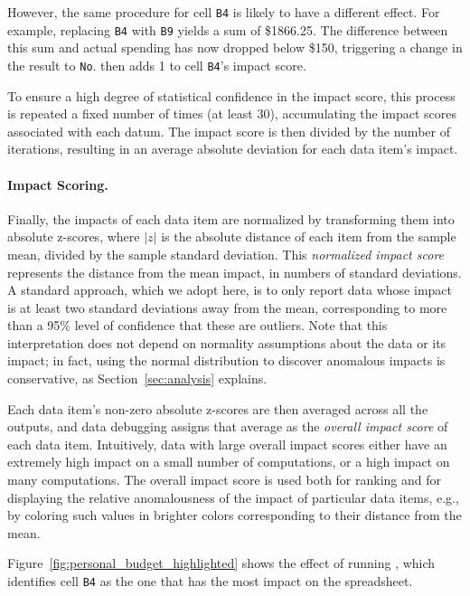 However, the same procedure for cell \texttt{B4} is likely to have a
different effect.  For example, replacing \texttt{B4}
with \texttt{B9} yields a sum of \$1866.25. The difference
between this sum and actual spending has now dropped below \$150,
triggering a change in the result to \texttt{No}. \checkcell{} then
adds 1 to cell \texttt{B4}'s impact score.


To ensure a high degree of statistical confidence in the impact score,
this process is repeated a fixed number of times (at least 30),
accumulating the impact scores associated with each datum. The impact
score is then divided by the number of iterations, resulting in an
average absolute deviation for each data item's impact.

\paragraph{Impact Scoring.}
Finally, the impacts of each data item are normalized by transforming
them into absolute z-scores, where $|z|$ is the absolute distance of
each item from the sample mean, divided by the sample standard
deviation. This \emph{normalized impact score} represents the distance
from the mean impact, in numbers of standard deviations. A standard
approach, which we adopt here, is to only report data whose impact is
at least two standard deviations away from the mean, corresponding to
more than a 95\% level of confidence that these are outliers.  Note
that this interpretation does not depend on normality assumptions
about the data or its impact; in fact, using the normal distribution
to discover anomalous impacts is conservative, as
Section~\ref{sec:analysis} explains.

Each data item's non-zero absolute z-scores are then averaged across
all the outputs, and data debugging assigns that average as the
\emph{overall impact score} of each data item. Intuitively, data with
large overall impact scores either have an extremely high impact on a
small number of computations, or a high impact on many
computations. The overall impact score is used both for ranking and
for displaying the relative anomalousness of the impact of particular
data items, e.g., by coloring such values in brighter colors
corresponding to their distance from the mean.

Figure~\ref{fig:personal_budget_highlighted} shows the effect of
running \checkcell{}, which identifies cell \texttt{B4} as the one
that has the most impact on the spreadsheet.

